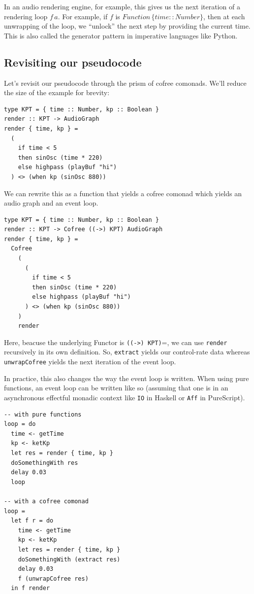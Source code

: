 \documentclass{article}
\begin{document}
In an audio rendering engine, for example, this gives us the next iteration of a rendering loop $f\,a$. For example, if $f$ is $Function\,\{ time :: Number \}$, then at each unwrapping of the loop, we ``unlock'' the next step by providing the current time. This is also called the generator pattern in imperative languages like Python.

\subsection{Revisiting our pseudocode}

Let's revisit our pseudocode through the prism of cofree comonads. We'll reduce the size of the example for brevity:

\lstset{language=Haskell, style=psstyle}
\begin{lstlisting}
type KPT = { time :: Number, kp :: Boolean }
render :: KPT -> AudioGraph
render { time, kp } =
  (
    if time < 5
    then sinOsc (time * 220)
    else highpass (playBuf "hi")
  ) <> (when kp (sinOsc 880))
\end{lstlisting}

We can rewrite this as a function that yields a cofree comonad which yields an audio graph and an event loop.

\lstset{language=Haskell, style=psstyle}
\begin{lstlisting}
type KPT = { time :: Number, kp :: Boolean }
render :: KPT -> Cofree ((->) KPT) AudioGraph
render { time, kp } =
  Cofree
    (
      (
        if time < 5
        then sinOsc (time * 220)
        else highpass (playBuf "hi")
      ) <> (when kp (sinOsc 880))
    )
    render
\end{lstlisting}

Here, beacuse the underlying Functor is \texttt{((->) KPT)}=, we can use \texttt{render} recursively in its own definition. So, \texttt{extract} yields our control-rate data whereas \texttt{unwrap\-Cofree} yields the next iteration of the event loop.

In practice, this also changes the way the event loop is written. When using pure functions, an event loop can be written like so (assuming that one is in an asynchronous effectful monadic context like \texttt{IO} in Haskell or \texttt{Aff} in PureScript).

\lstset{language=Haskell, style=psstyle}
\begin{lstlisting}
-- with pure functions
loop = do
  time <- getTime
  kp <- ketKp
  let res = render { time, kp }
  doSomethingWith res
  delay 0.03
  loop

-- with a cofree comonad
loop =
  let f r = do
    time <- getTime
    kp <- ketKp
    let res = render { time, kp }
    doSomethingWith (extract res)
    delay 0.03
    f (unwrapCofree res)
  in f render
\end{lstlisting}
\end{document}
